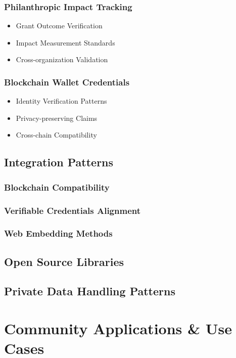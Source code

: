 \documentclass[11pt]{article}
\begin{document}
\subsubsection{Philanthropic Impact Tracking}
\begin{itemize}
    \item Grant Outcome Verification
    \item Impact Measurement Standards
    \item Cross-organization Validation
\end{itemize}

\subsubsection{Blockchain Wallet Credentials}
\begin{itemize}
    \item Identity Verification Patterns
    \item Privacy-preserving Claims
    \item Cross-chain Compatibility
\end{itemize}

\subsection{Integration Patterns}
\subsubsection{Blockchain Compatibility}
\subsubsection{Verifiable Credentials Alignment}
\subsubsection{Web Embedding Methods}

\subsection{Open Source Libraries}
\subsection{Private Data Handling Patterns}

\section{Community Applications \& Use Cases}
\end{document}

